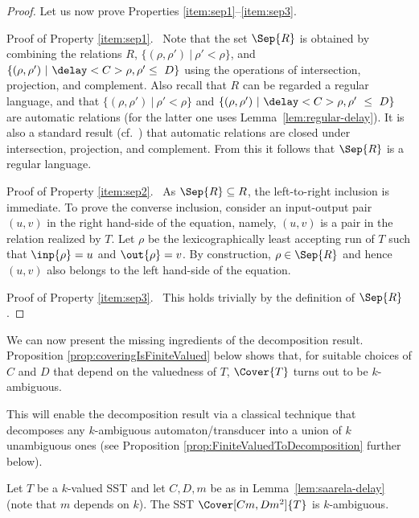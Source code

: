 \documentclass{article}
\begin{document}
\begin{proof}
Let us now prove Properties \ref{item:sep1}--\ref{item:sep3}.


\smallskip\noindent
{\sc Proof of Property \ref{item:sep1}.}~
Note that the set $\Sep{R}$ is obtained 
by combining the relations $R$, 
$\{ (\rho,\rho') ~|~ \rho' < \rho\}$, and
$\{ (\rho,\rho') ~|~ \delay<C>{\rho,\rho'} \leq~D\}$ 
using the operations of intersection, projection, and complement.
Also recall that $R$ can be regarded a regular language, and that
$\{ (\rho,\rho') ~|~ \rho' < \rho\}$ and
$\{ (\rho,\rho') ~|~ \delay<C>{\rho,\rho'}~\leq ~D\}$
are automatic relations (for the latter one uses Lemma~\ref{lem:regular-delay}).
It is also a standard result (cf.~\cite{Hodgson83,KhoussainovN95,BlumensathG00})
that automatic relations are closed under intersection, projection, and
complement.
From this it follows that $\Sep{R}$ is a regular language.



\smallskip\noindent
{\sc Proof of Property \ref{item:sep2}.}~
As $\Sep{R} \subseteq R$, the left-to-right inclusion is immediate.
To prove the converse inclusion,
consider an input-output pair $(u,v)$ in the right hand-side of the equation,
namely, $(u,v)$ is a pair in the relation realized by $T$.
Let $\rho$ be the lexicographically least accepting run of $T$
such that $\inp{\rho}=u$ and $\out{\rho}=v$.
By construction, $\rho\in\Sep{R}$ and hence $(u,v)$ also belongs to the
left hand-side of the equation.


\smallskip\noindent
{\sc Proof of Property \ref{item:sep3}.}~
This holds trivially by the definition of $\Sep{R}$.
\end{proof}

We can now present the missing ingredients of the decomposition result.
Proposition \ref{prop:coveringIsFiniteValued} below
shows that, for suitable choices of $C$ and $D$
that depend on the valuedness of $T$, 
$\Cover{T}$ turns out to be $k$-ambiguous.

This will enable the decomposition result
via a classical technique that decomposes any 
$k$-ambiguous automaton/transducer into a 
union of $k$ unambiguous ones
(see Proposition \ref{prop:FiniteValuedToDecomposition}
further below). 


\begin{proposition}\label{prop:coveringIsFiniteValued}
Let $T$ be a $k$-valued SST and let $C,D,m$ be
as in Lemma~\ref{lem:saarela-delay} (note that $m$ depends on $k$).
The SST $\Cover[Cm,Dm^2]{T}$ is $k$-ambiguous.
\end{proposition}
\end{document}
